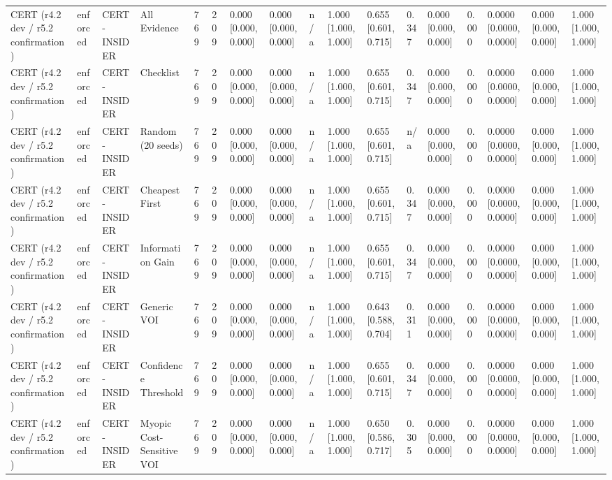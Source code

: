 \begin{table}[!ht]
{\begin{tabular}{lllllllllllllllll}
CERT (r4.2 dev / r5.2 confirmation) & enforced & CERT-INSIDER & All Evidence & 769 & 209 & 0.000 [0.000, 0.000] & 0.000 [0.000, 0.000] & n/a & 1.000 [1.000, 1.000] & 0.655 [0.601, 0.715] & 0.347 & 0.000 [0.000, 0.000] & 0.000 & 0.0000 [0.0000, 0.0000] & 0.000 [0.000, 0.000] & 1.000 [1.000, 1.000] \\
CERT (r4.2 dev / r5.2 confirmation) & enforced & CERT-INSIDER & Checklist & 769 & 209 & 0.000 [0.000, 0.000] & 0.000 [0.000, 0.000] & n/a & 1.000 [1.000, 1.000] & 0.655 [0.601, 0.715] & 0.347 & 0.000 [0.000, 0.000] & 0.000 & 0.0000 [0.0000, 0.0000] & 0.000 [0.000, 0.000] & 1.000 [1.000, 1.000] \\
CERT (r4.2 dev / r5.2 confirmation) & enforced & CERT-INSIDER & Random (20 seeds) & 769 & 209 & 0.000 [0.000, 0.000] & 0.000 [0.000, 0.000] & n/a & 1.000 [1.000, 1.000] & 0.655 [0.601, 0.715] & n/a & 0.000 [0.000, 0.000] & 0.000 & 0.0000 [0.0000, 0.0000] & 0.000 [0.000, 0.000] & 1.000 [1.000, 1.000] \\
CERT (r4.2 dev / r5.2 confirmation) & enforced & CERT-INSIDER & Cheapest First & 769 & 209 & 0.000 [0.000, 0.000] & 0.000 [0.000, 0.000] & n/a & 1.000 [1.000, 1.000] & 0.655 [0.601, 0.715] & 0.347 & 0.000 [0.000, 0.000] & 0.000 & 0.0000 [0.0000, 0.0000] & 0.000 [0.000, 0.000] & 1.000 [1.000, 1.000] \\
CERT (r4.2 dev / r5.2 confirmation) & enforced & CERT-INSIDER & Information Gain & 769 & 209 & 0.000 [0.000, 0.000] & 0.000 [0.000, 0.000] & n/a & 1.000 [1.000, 1.000] & 0.655 [0.601, 0.715] & 0.347 & 0.000 [0.000, 0.000] & 0.000 & 0.0000 [0.0000, 0.0000] & 0.000 [0.000, 0.000] & 1.000 [1.000, 1.000] \\
CERT (r4.2 dev / r5.2 confirmation) & enforced & CERT-INSIDER & Generic VOI & 769 & 209 & 0.000 [0.000, 0.000] & 0.000 [0.000, 0.000] & n/a & 1.000 [1.000, 1.000] & 0.643 [0.588, 0.704] & 0.311 & 0.000 [0.000, 0.000] & 0.000 & 0.0000 [0.0000, 0.0000] & 0.000 [0.000, 0.000] & 1.000 [1.000, 1.000] \\
CERT (r4.2 dev / r5.2 confirmation) & enforced & CERT-INSIDER & Confidence Threshold & 769 & 209 & 0.000 [0.000, 0.000] & 0.000 [0.000, 0.000] & n/a & 1.000 [1.000, 1.000] & 0.655 [0.601, 0.715] & 0.347 & 0.000 [0.000, 0.000] & 0.000 & 0.0000 [0.0000, 0.0000] & 0.000 [0.000, 0.000] & 1.000 [1.000, 1.000] \\
CERT (r4.2 dev / r5.2 confirmation) & enforced & CERT-INSIDER & Myopic Cost-Sensitive VOI & 769 & 209 & 0.000 [0.000, 0.000] & 0.000 [0.000, 0.000] & n/a & 1.000 [1.000, 1.000] & 0.650 [0.586, 0.717] & 0.305 & 0.000 [0.000, 0.000] & 0.000 & 0.0000 [0.0000, 0.0000] & 0.000 [0.000, 0.000] & 1.000 [1.000, 1.000] \\

\end{tabular}}
\end{table}
